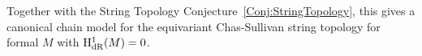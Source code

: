 \documentclass[\MainFolder/Text.tex]{subfiles}
\begin{document}
Together with the String Topology Conjecture~\ref{Conj:StringTopology}, this gives a canonical chain model for the equivariant Chas-Sullivan string topology for formal $M$ with $\mathrm{H}_{\mathrm{dR}}^1(M)=0$.

%
%
\end{document}
